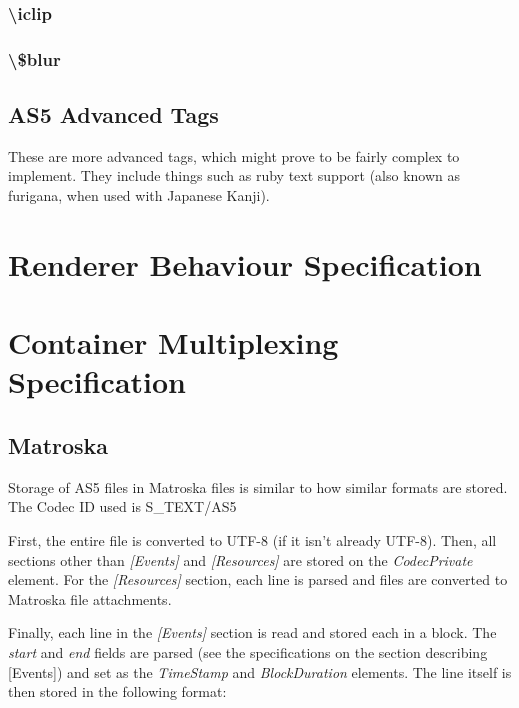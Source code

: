 \documentclass{spec}
\begin{document}
\subsubsection{\textbackslash iclip}

\subsubsection{\textbackslash \$blur}


\subsection{AS5 Advanced Tags}
These are more advanced tags, which might prove to be fairly complex to implement. They include
things such as ruby text support (also known as furigana, when used with Japanese Kanji).



\newpage
\section{Renderer Behaviour Specification}


\newpage
\section{Container Multiplexing Specification}

\subsection{Matroska}
Storage of AS5 files in Matroska files is similar to how similar formats are stored.\cite{mkv ssa}
The Codec ID used is \textsc{S\_TEXT/AS5}

First, the entire file is converted to UTF-8 (if it isn't already UTF-8). Then, all sections other
than \emph{[Events]} and \emph{[Resources]} are stored on the \emph{CodecPrivate} element. For the
\emph{[Resources]} section, each line is parsed and files are converted to Matroska file attachments.

Finally, each line in the \emph{[Events]} section is read and stored each in a block. The \emph{start}
and \emph{end} fields are parsed (see the specifications on the section describing [Events]) and set
as the \emph{TimeStamp} and \emph{BlockDuration} elements. The line itself is then stored in the
following format:
\end{document}
